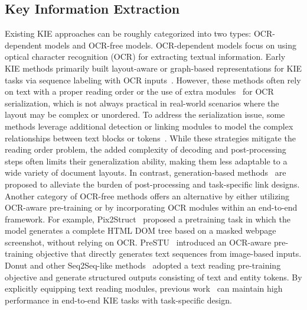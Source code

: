     \subsection{Key Information Extraction} 
Existing KIE approaches can be roughly categorized into two types: OCR-dependent models and OCR-free models. OCR-dependent models focus on using optical character recognition (OCR) for extracting textual information. Early KIE methods primarily built layout-aware or graph-based representations for KIE tasks via sequence labeling with OCR inputs~\cite{liao2022real,shi2016end,da2023multi,xu2020layoutlm, xu2021layoutlmv2, huang2022layoutlmv3, xu2021layoutxlm,li2021structurallm,appalaraju2021docformer,li2021selfdoc,gu2021unidoc,gu2022xylayoutlm,lee2022formnet,peng2022ernie,luo2023geolayoutlm,Yu2020PICKPK}. However, these methods often rely on text with a proper reading order or the use of extra modules~\cite{wang2021layoutreader, zhang2023reading} for OCR serialization, which is not always practical in real-world scenarios where the layout may be complex or unordered.
To address the serialization issue, some methods leverage additional detection or linking modules to model the complex relationships between text blocks or tokens~\cite{hwang2021spatial,xu2021layoutxlm,hong2022bros,yu2022structextv2,luo2023geolayoutlm,yang2023modeling,zhang2023reading,wei2023ppn,Yu2023ICDAR2C}. While these strategies mitigate the reading order problem, the added complexity of decoding and post-processing steps often limits their generalization ability, making them less adaptable to a wide variety of document layouts.
In contrast, generation-based methods~\cite{tang2023unifying,cao2023genkie,cao2022query} are proposed to alleviate the burden of post-processing and task-specific link designs. Another category of OCR-free methods offers an alternative by either utilizing OCR-aware pre-training or by incorporating OCR modules within an end-to-end framework.
For example, Pix2Struct~\cite{Lee2022Pix2StructSP} proposed a pretraining task in which the model generates a complete HTML DOM tree based on a masked webpage screenshot, without relying on OCR.
PreSTU~\cite{Kil2022PreSTUPF} introduced an OCR-aware pre-training objective that directly generates text sequences from image-based inputs. Donut and other Seq2Seq-like methods~\cite{kim2022donut,davis2022end,dhouib2023docparser,cao2023attention} adopted a text reading pre-training objective and generate structured outputs consisting of text and entity tokens.
By explicitly equipping text reading modules, previous work~\cite{wang2021towards,tang2021matchvie,zhang2020trie,kuang2023visual,yu2022structextv2} can maintain high performance in end-to-end KIE tasks with task-specific design.

